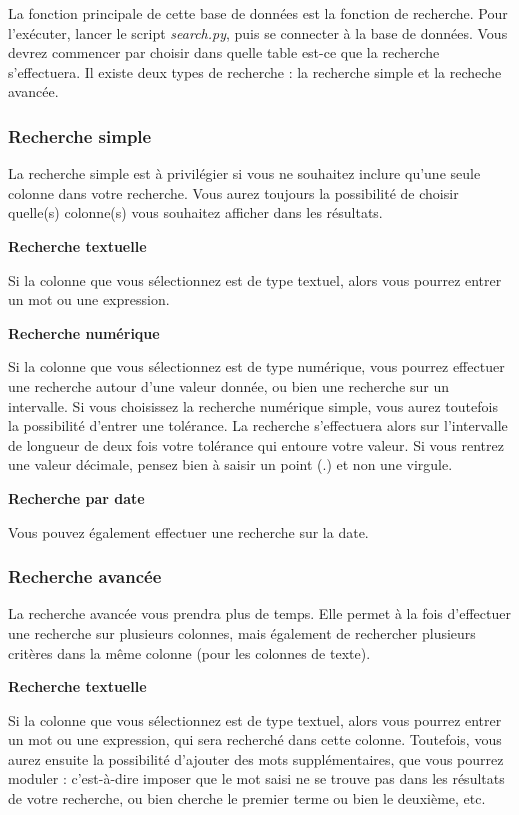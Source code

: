 \documentclass[12pt,a4paper]{article}
\begin{document}
    La fonction principale de cette base de données est la fonction de recherche.
    Pour l'exécuter, lancer le script \emph{search.py}, puis se connecter à la base de données.
    Vous devrez commencer par choisir dans quelle table est-ce que la recherche s'effectuera.
    Il existe deux types de recherche : la recherche simple et la recheche avancée.

    \subsubsection{Recherche simple}
        La recherche simple est à privilégier si vous ne souhaitez inclure qu'une seule colonne dans votre recherche.
        Vous aurez toujours la possibilité de choisir quelle(s) colonne(s) vous souhaitez afficher dans les résultats.


        \medskip
        \textbf{Recherche textuelle}

        Si la colonne que vous sélectionnez est de type textuel, alors vous pourrez entrer un mot ou une expression.
        
        \medskip
        \textbf{Recherche numérique}
        
        Si la colonne que vous sélectionnez est de type numérique, vous pourrez effectuer une recherche autour d'une valeur donnée,
        ou bien une recherche sur un intervalle. Si vous choisissez la recherche numérique simple, vous aurez toutefois
        la possibilité d'entrer une tolérance. La recherche s'effectuera alors sur l'intervalle de longueur de deux fois votre tolérance
        qui entoure votre valeur.
        Si vous rentrez une valeur décimale, pensez bien à saisir un point (.) et non une virgule.

        \medskip
        \textbf{Recherche par date}
        
        Vous pouvez également effectuer une recherche sur la date.

    \subsubsection{Recherche avancée}
        La recherche avancée vous prendra plus de temps. Elle permet à la fois d'effectuer une recherche sur plusieurs colonnes,
        mais également de rechercher plusieurs critères dans la même colonne (pour les colonnes de texte).

        \medskip
        \textbf{Recherche textuelle}

        Si la colonne que vous sélectionnez est de type textuel, alors vous pourrez entrer un mot ou une expression, qui sera recherché
        dans cette colonne. Toutefois, vous aurez ensuite la possibilité d'ajouter des mots supplémentaires, que vous pourrez moduler :
        c'est-à-dire imposer que le mot saisi ne se trouve pas dans les résultats de votre recherche, ou bien cherche le premier terme
        ou bien le deuxième, etc.
        
\end{document}

